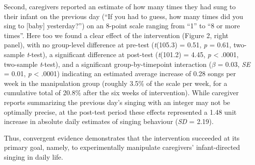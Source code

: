 \documentclass[
]{article}
\begin{document}
Second, caregivers reported an estimate of how many times they had sung
to their infant on the previous day (``If you had to guess, how many
times did you sing to {[}baby{]} yesterday?'') on an 8-point scale
ranging from ``1'' to ``8 or more times''. Here too we found a clear
effect of the intervention (Figure 2, right panel), with no group-level
difference at pre-test (\emph{t}(105.3) = 0.51, \emph{p} = 0.61,
two-sample \emph{t}-test), a significant difference at post-test
(\emph{t}(101.2) = 4.45, \emph{p} \textless{} .0001, two-sample
\emph{t}-test), and a significant group-by-timepoint interaction
(\(\beta\) = 0.03, \emph{SE} = 0.01, \emph{p} \textless{} .0001)
indicating an estimated average increase of 0.28 songs per week in the
manipulation group (roughly 3.5\% of the scale per week, for a
cumulative total of 20.8\% after the six weeks of intervention). While
caregiver reports summarizing the previous day's singing with an integer
may not be optimally precise, at the post-test period these effects
represented a 1.48 unit increase in absolute daily estimates of singing
behaviour (\emph{SD} = 2.19).

Thus, convergent evidence demonstrates that the intervention succeeded
at its primary goal, namely, to experimentally manipulate caregivers'
infant-directed singing in daily life.
\end{document}
